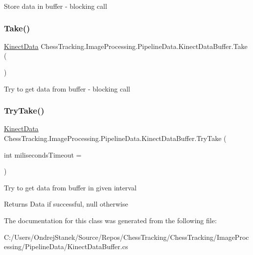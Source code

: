 Store data in buffer -\/ blocking call 

\mbox{\label{class_chess_tracking_1_1_image_processing_1_1_pipeline_data_1_1_kinect_data_buffer_a4a0b205edd0724a90ad3c46a91bd6b10}} 
\subsubsection{\texorpdfstring{Take()}{Take()}}
{\footnotesize\ttfamily \mbox{\hyperlink{class_chess_tracking_1_1_image_processing_1_1_pipeline_data_1_1_kinect_data}{Kinect\+Data}} Chess\+Tracking.\+Image\+Processing.\+Pipeline\+Data.\+Kinect\+Data\+Buffer.\+Take (\begin{DoxyParamCaption}{ }\end{DoxyParamCaption})}



Try to get data from buffer -\/ blocking call 

\mbox{\label{class_chess_tracking_1_1_image_processing_1_1_pipeline_data_1_1_kinect_data_buffer_a6309fa36d0985a0d8ea72718155a5d9f}} 
\subsubsection{\texorpdfstring{TryTake()}{TryTake()}}
{\footnotesize\ttfamily \mbox{\hyperlink{class_chess_tracking_1_1_image_processing_1_1_pipeline_data_1_1_kinect_data}{Kinect\+Data}} Chess\+Tracking.\+Image\+Processing.\+Pipeline\+Data.\+Kinect\+Data\+Buffer.\+Try\+Take (\begin{DoxyParamCaption}\item[{int}]{miliseconds\+Timeout = {} }\end{DoxyParamCaption})}



Try to get data from buffer in given interval 

\begin{DoxyReturn}{Returns}
Data if successful, null otherwise
\end{DoxyReturn}


The documentation for this class was generated from the following file\+:\begin{DoxyCompactItemize}
\item 
C\+:/\+Users/\+Ondrej\+Stanek/\+Source/\+Repos/\+Chess\+Tracking/\+Chess\+Tracking/\+Image\+Processing/\+Pipeline\+Data/Kinect\+Data\+Buffer.\+cs\end{DoxyCompactItemize}
